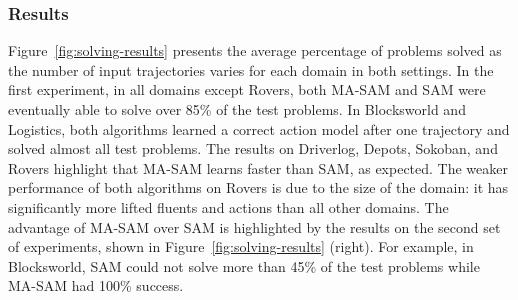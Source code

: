 \documentclass[letterpaper]{article} %
\theoremstyle{definition}
\theoremstyle{remark}
\newcommand{\sam}{\ac{SAM}\xspace}
\newcommand{\masam}{\ac{MA-SAM}\xspace}
\begin{document}





\subsubsection{Results}
\label{sec:results}

Figure~\ref{fig:solving-results} presents the average percentage of problems solved as the number of input trajectories varies for each domain in both settings.
In the first experiment, in all domains except Rovers, both \masam and \sam were eventually able to solve over 85\% of the test problems. 
In Blocksworld and Logistics, both algorithms learned a correct action model after one trajectory and solved almost all test problems. 
The results on Driverlog, Depots, Sokoban, and Rovers highlight that  \masam learns faster than \sam, as expected. %
The weaker performance of both algorithms on Rovers is due to the size of the domain: it has significantly more lifted fluents and actions than all other domains. 
The advantage of \masam over \sam is highlighted by the results on the second set of experiments, shown in Figure~\ref{fig:solving-results} (right). 
For example, in Blocksworld, \sam could not solve more than 45\% of the test problems while \masam had 100\% success. 
\end{document}
